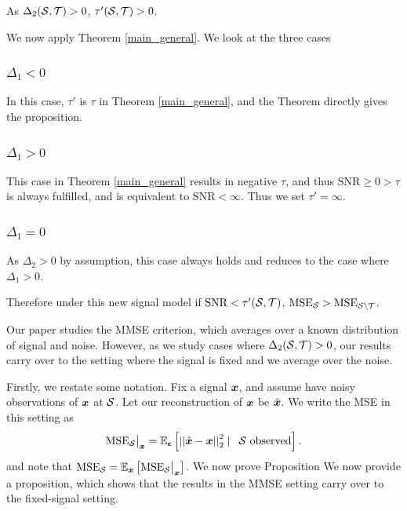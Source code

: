 As ${\Delta_2(\mathcal{S}, \mathcal{T})} > 0$, $\tau'(\mathcal{S},\mathcal{T}) > 0$.

We now apply Theorem \ref{main_general}. We look at the three cases
\subsubsection{$\Delta_{1} < 0$}
In this case, $\tau'$ is $\tau$ in Theorem \ref{main_general}, and the Theorem directly gives the proposition.
\subsubsection{$\Delta_{1} > 0$}
This case in Theorem \ref{main_general} results in negative $\tau$, and thus $\text{SNR} \geq 0 > \tau $ is always fulfilled, and is equivalent to $\text{SNR} < \infty$. Thus we set $\tau' = \infty$.

\subsubsection{$\Delta_{1} = 0$}
As $\Delta_{2} > 0$ by assumption, this case always holds and reduces to the case where $\Delta_{1} > 0$.

Therefore under this new signal model if $\text{SNR} < \tau'(\mathcal{S},\mathcal{T})$, $\text{MSE}_{\mathcal{S}} > \text{MSE}_{\mathcal{S} \backslash \mathcal{T}}$.

\iffalse
Our paper studies the MMSE criterion, which averages over a known distribution of signal and noise. However, as we study cases where $\Delta_{2}(\mathcal{S},\mathcal{T}) > 0$, our results carry over to the setting where the signal is fixed and we average over the noise.

Firstly, we restate some notation. Fix a signal $\bm{x}$, and assume have noisy observations of $\bm{x}$ at $\mathcal{S}$. Let our reconstruction of $\bm{x}$ be $\hat{\bm{x}}$. We write the MSE in this setting as
\begin{equation}
\textrm{MSE}_{\set{S}}\big\vert_{\vect{x}} = \expect[\vect{\epsilon}]{\sqnormvec{\hat{\vect{x}} - \vect{x}} \smallskip \mid \enspace \set{S} \textrm{ observed} }.
\end{equation}
and note that $\text{MSE}_{\set{S}} = \expect[\vect{x}]{\textrm{MSE}_{\set{S}}\big\vert_{\vect{x}}}$.
We now prove Proposition
We now provide a proposition, which shows that the results in the MMSE setting carry over to the fixed-signal setting.

